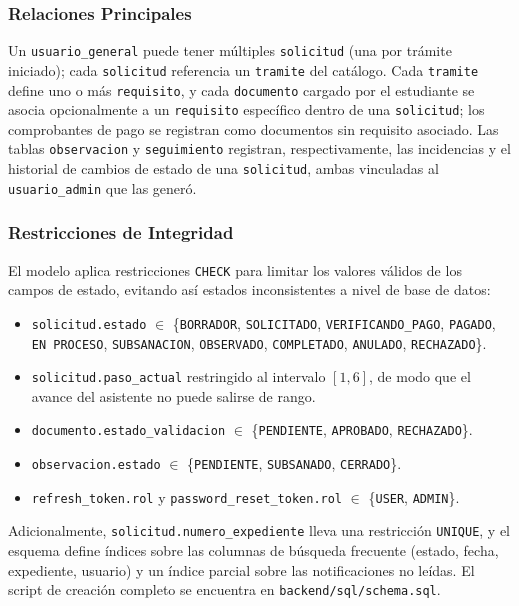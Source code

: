 \subsubsection{Relaciones Principales}
Un \texttt{usuario\_general} puede tener múltiples \texttt{solicitud} (una
por trámite iniciado); cada \texttt{solicitud} referencia un
\texttt{tramite} del catálogo. Cada \texttt{tramite} define uno o más
\texttt{requisito}, y cada \texttt{documento} cargado por el estudiante se
asocia opcionalmente a un \texttt{requisito} específico dentro de una
\texttt{solicitud}; los comprobantes de pago se registran como documentos sin
requisito asociado. Las tablas \texttt{observacion} y \texttt{seguimiento}
registran, respectivamente, las incidencias y el historial de cambios de
estado de una \texttt{solicitud}, ambas vinculadas al
\texttt{usuario\_admin} que las generó.

\subsubsection{Restricciones de Integridad}
El modelo aplica restricciones \texttt{CHECK} para limitar los valores
válidos de los campos de estado, evitando así estados inconsistentes a nivel
de base de datos:
\begin{itemize}
    \item \texttt{solicitud.estado} $\in$ \{\texttt{BORRADOR},
    \texttt{SOLICITADO}, \texttt{VERIFICANDO\_PAGO}, \texttt{PAGADO},
    \texttt{EN PROCESO}, \texttt{SUBSANACION}, \texttt{OBSERVADO},
    \texttt{COMPLETADO}, \texttt{ANULADO}, \texttt{RECHAZADO}\}.
    \item \texttt{solicitud.paso\_actual} restringido al intervalo $[1,6]$,
    de modo que el avance del asistente no puede salirse de rango.
    \item \texttt{documento.estado\_validacion} $\in$ \{\texttt{PENDIENTE},
    \texttt{APROBADO}, \texttt{RECHAZADO}\}.
    \item \texttt{observacion.estado} $\in$ \{\texttt{PENDIENTE},
    \texttt{SUBSANADO}, \texttt{CERRADO}\}.
    \item \texttt{refresh\_token.rol} y \texttt{password\_reset\_token.rol}
    $\in$ \{\texttt{USER}, \texttt{ADMIN}\}.
\end{itemize}
Adicionalmente, \texttt{solicitud.numero\_expediente} lleva una restricción
\texttt{UNIQUE}, y el esquema define índices sobre las columnas de búsqueda
frecuente (estado, fecha, expediente, usuario) y un índice parcial sobre las
notificaciones no leídas. El script de creación completo se encuentra en
\texttt{backend/sql/schema.sql}.

